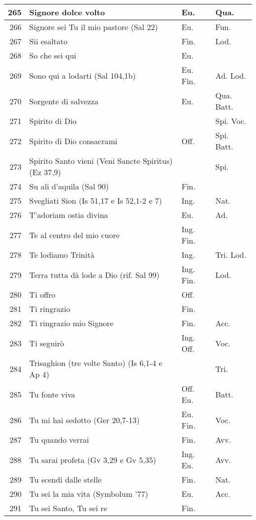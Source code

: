 {\begin{center}
\begin{longtable}{ | r | m{4.7cm} | m{1.8cm} | m{2cm}  |}
    265 & Signore dolce volto & Eu. & Qua.\\ \hline
    266 & Signore sei Tu il mio pastore (Sal 22) & Eu. & Fun.\\ \hline
    267 & Sii esaltato & Fin. & Lod.\\ \hline
    268 & So che sei qui & Eu. & \\ \hline
    269 & Sono qui a lodarti (Sal 104,1b) & Eu. Fin. & Ad. Lod.\\ \hline
    270 & Sorgente di salvezza & Eu. & Qua. Batt.\\ \hline
    271 & Spirito di Dio &  & Spi. Voc.\\ \hline
    272 & Spirito di Dio consacrami & Off. & Spi. Batt.\\ \hline
    273 & Spirito Santo vieni (Veni Sancte Spiritus) (Ez 37,9) &  & Spi.\\ \hline
    274 & Su ali d'aquila (Sal 90) & Fin. & \\ \hline
    275 & Svegliati Sion (Is 51,17 e Is 52,1-2 e 7) & Ing. & Nat.\\ \hline
    276 & T'adoriam ostia divina & Eu. & Ad.\\ \hline
    277 & Te al centro del mio cuore & Ing. Fin. & \\ \hline
    278 & Te lodiamo Trinità & Ing. & Tri. Lod.\\ \hline
    279 & Terra tutta dà lode a Dio (rif. Sal 99) & Ing. Fin. & Lod.\\ \hline
    280 & Ti offro & Off. & \\ \hline
    281 & Ti ringrazio & Fin. & \\ \hline
    282 & Ti ringrazio mio Signore & Fin. & Acc.\\ \hline
    283 & Ti seguirò & Ing. Off. & Voc.\\ \hline
    284 & Trisaghion (tre volte Santo) (Is 6,1-4 e Ap 4) &  & Tri.\\ \hline
    285 & Tu fonte viva & Off. Eu. & Batt.\\ \hline
    286 & Tu mi hai sedotto (Ger 20,7-13) & Eu. Fin. & Voc.\\ \hline
    287 & Tu quando verrai & Fin. & Avv.\\ \hline
    288 & Tu sarai profeta (Gv 3,29 e Gv 5,35) & Ing. Eu. & Avv.\\ \hline
    289 & Tu scendi dalle stelle & Fin. & Nat.\\ \hline
    290 & Tu sei la mia vita (Symbolum '77) & Eu. & Acc.\\ \hline
    291 & Tu sei Santo, Tu sei re & Fin. & \\ \hline

\end{longtable}
\end{center}}
